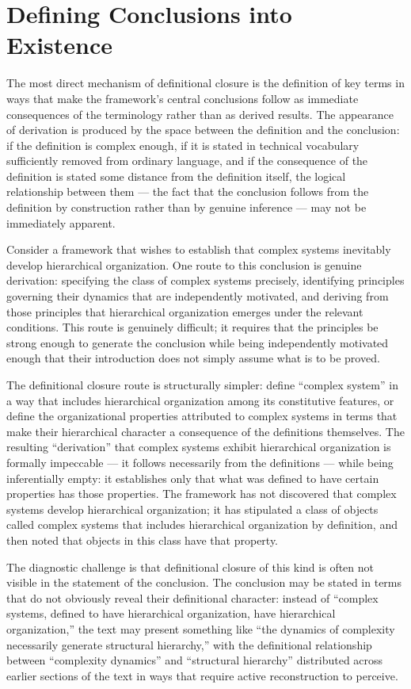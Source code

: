 \documentclass[12pt, openright, twoside]{book}
\begin{document}
\section{Defining Conclusions into Existence}

The most direct mechanism of definitional closure is the
definition of key terms in ways that make the framework's
central conclusions follow as immediate consequences of the
terminology rather than as derived results. The appearance
of derivation is produced by the space between the definition
and the conclusion: if the definition is complex enough, if
it is stated in technical vocabulary sufficiently removed from
ordinary language, and if the consequence of the definition
is stated some distance from the definition itself, the logical
relationship between them --- the fact that the conclusion
follows from the definition by construction rather than by
genuine inference --- may not be immediately apparent.

Consider a framework that wishes to establish that complex
systems inevitably develop hierarchical organization. One route
to this conclusion is genuine derivation: specifying the class
of complex systems precisely, identifying principles governing
their dynamics that are independently motivated, and deriving
from those principles that hierarchical organization emerges
under the relevant conditions. This route is genuinely
difficult; it requires that the principles be strong enough
to generate the conclusion while being independently motivated
enough that their introduction does not simply assume what
is to be proved.

The definitional closure route is structurally simpler: define
``complex system'' in a way that includes hierarchical
organization among its constitutive features, or define
the organizational properties attributed to complex systems
in terms that make their hierarchical character a consequence
of the definitions themselves. The resulting ``derivation''
that complex systems exhibit hierarchical organization is
formally impeccable --- it follows necessarily from the
definitions --- while being inferentially empty: it establishes
only that what was defined to have certain properties has
those properties. The framework has not discovered that
complex systems develop hierarchical organization; it has
stipulated a class of objects called complex systems that
includes hierarchical organization by definition, and then
noted that objects in this class have that property.

The diagnostic challenge is that definitional closure of this
kind is often not visible in the statement of the conclusion.
The conclusion may be stated in terms that do not obviously
reveal their definitional character: instead of ``complex
systems, defined to have hierarchical organization, have
hierarchical organization,'' the text may present something
like ``the dynamics of complexity necessarily generate
structural hierarchy,'' with the definitional relationship
between ``complexity dynamics'' and ``structural hierarchy''
distributed across earlier sections of the text in ways that
require active reconstruction to perceive.
\end{document}
